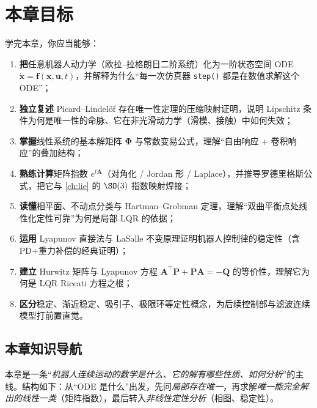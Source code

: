 \section*{本章目标}
学完本章，你应当能够：
\begin{enumerate}
  \item \textbf{把}任意机器人动力学（欧拉--拉格朗日二阶系统）化为一阶状态空间 ODE $\dot{\mathbf{x}}=\mathbf{f}(\mathbf{x},\mathbf{u},t)$，并解释为什么“每一次仿真器 \texttt{step()} 都是在数值求解这个 ODE”；
  \item \textbf{独立复述} Picard--Lindelöf 存在唯一性定理的压缩映射证明，说明 Lipschitz 条件为何是唯一性的命脉、它在非光滑动力学（滑模、接触）中如何失效；
  \item \textbf{掌握}线性系统的基本解矩阵 $\boldsymbol{\Phi}$ 与常数变易公式，理解“自由响应 $+$ 卷积响应”的叠加结构；
  \item \textbf{熟练计算}矩阵指数 $e^{t\mathbf{A}}$（对角化 / Jordan 形 / Laplace），并推导罗德里格斯公式，把它与 \cref{ch:lie} 的 $\SO(3)$ 指数映射焊接；
  \item \textbf{读懂}相平面、不动点分类与 Hartman--Grobman 定理，理解“双曲平衡点处线性化定性可靠”为何是局部 LQR 的依据；
  \item \textbf{运用} Lyapunov 直接法与 LaSalle 不变原理证明机器人控制律的稳定性（含 PD$+$重力补偿的经典证明）；
  \item \textbf{建立} Hurwitz 矩阵与 Lyapunov 方程 $\mathbf{A}^\top\mathbf{P}+\mathbf{P}\mathbf{A}=-\mathbf{Q}$ 的等价性，理解它为何是 LQR Riccati 方程之根；
  \item \textbf{区分}稳定、渐近稳定、吸引子、极限环等定性概念，为后续控制部与滤波连续模型打前置直觉。
\end{enumerate}

\subsection*{本章知识导航}
本章是一条“\emph{机器人连续运动的数学是什么、它的解有哪些性质、如何分析}”的主线。结构如下：从“ODE 是什么”出发，先问\emph{局部存在唯一}，再求解\emph{唯一能完全解出的线性一类}（矩阵指数），最后转入\emph{非线性定性分析}（相图、稳定性）。

